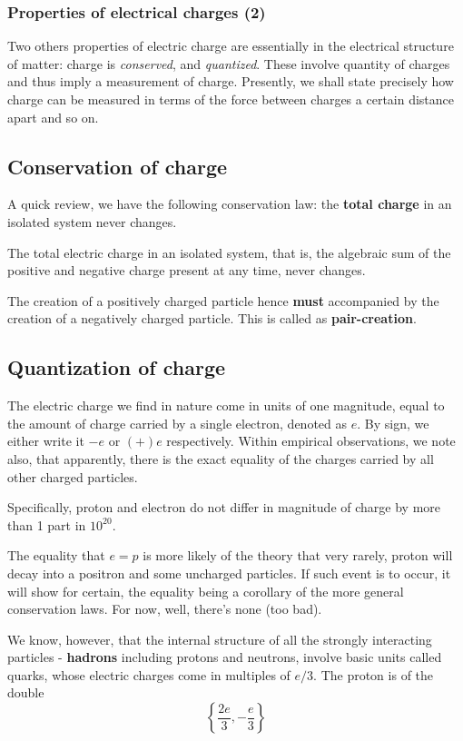 \subsubsection{Properties of electrical charges (2)}

Two others properties of electric charge are essentially in the electrical structure of matter: charge is \textit{conserved}, and \textit{quantized}. These involve quantity of charges and thus imply a measurement of charge. Presently, we shall state precisely how charge can be measured in terms of the force between charges a certain distance apart and so on.

\subsection{Conservation of charge}
A quick review, we have the following conservation law: the \textbf{total charge} in an isolated system never changes. 
\begin{theorem}
    The total electric charge in an isolated system, that is, the algebraic sum of the positive and negative charge present at any time, never changes.
\end{theorem}

The creation of a positively charged particle hence \textbf{must} accompanied by the creation of a negatively charged particle. This is called as \textbf{pair-creation}. 

\subsection{Quantization of charge}
The electric charge we find in nature come in units of one magnitude, equal to the amount of charge carried by a single electron, denoted as $e$. By sign, we either write it $-e$ or $(+)e$ respectively. Within empirical observations, we note also, that apparently, there is the exact equality of the charges carried by all other charged particles. 

Specifically, proton and electron do not differ in magnitude of charge by more than 1 part in $10^{20}$. 

The equality that $e=p$ is more likely of the theory that very rarely, proton will decay into a positron and some uncharged particles. If such event is to occur, it will show for certain, the equality being a corollary of the more general conservation laws. For now, well, there's none (too bad). 

We know, however, that the internal structure of all the strongly interacting particles - \textbf{hadrons} including protons and neutrons, involve basic units called quarks, whose electric charges come in multiples of $e/3$. The proton is of the double $$\left\{  \frac{2e}{3}, - \frac{e}{3}  \right\}$$

